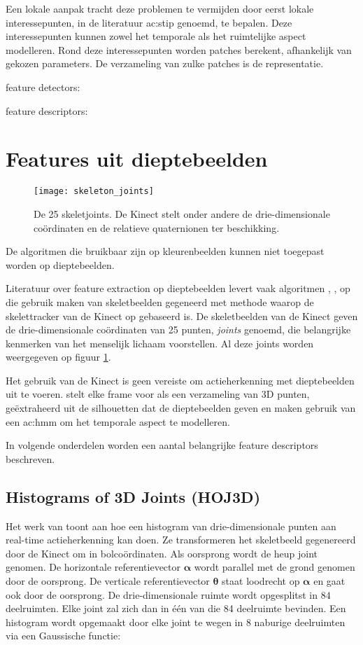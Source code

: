 Een lokale aanpak tracht deze problemen te vermijden door eerst lokale interessepunten, in de literatuur \gls{ac:stip} genoemd, te bepalen. Deze interessepunten kunnen zowel het temporale als het ruimtelijke aspect modelleren. Rond deze interessepunten worden patches berekent, afhankelijk van gekozen parameters. De verzameling van zulke patches is de representatie. 
 
feature detectors:

feature descriptors:
 
\section{Features uit dieptebeelden}
\begin{figure}
	\centering
	\texttt{[image: skeleton\_joints]}
	\caption{De 25 skeletjoints. De Kinect stelt onder andere de drie-dimensionale coördinaten en de relatieve quaternionen ter beschikking.}
	\label{fig:skeleton_joints}
\end{figure}
De algoritmen die bruikbaar zijn op kleurenbeelden kunnen niet toegepast worden op dieptebeelden. 

Literatuur over feature extraction op dieptebeelden levert vaak algoritmen \cite{Xia2012}, \cite{wang2012b}, \cite{Yang2012} op die gebruik maken van skeletbeelden gegeneerd met methode \cite{Shotton2011} waarop de skelettracker van de Kinect op gebaseerd is. De skeletbeelden van de Kinect geven de drie-dimensionale coördinaten van 25 punten, \textit{joints} genoemd, die belangrijke kenmerken van het menselijk lichaam voorstellen. Al deze joints worden weergegeven op figuur \ref{fig:skeleton_joints}.

Het gebruik van de Kinect is geen vereiste om actieherkenning met dieptebeelden uit te voeren. \cite{Li2010} stelt elke frame voor als een verzameling van 3D punten, geëxtraheerd uit de silhouetten dat de dieptebeelden geven en maken gebruik van een \gls{ac:hmm} om het temporale aspect te modelleren. \cite{Wang2012a} 

In volgende onderdelen worden een aantal belangrijke feature descriptors beschreven.
\subsection{Histograms of 3D Joints (HOJ3D)}
Het werk van \cite{Xia2012} toont aan hoe een histogram van drie-dimensionale punten aan real-time actieherkenning kan doen. Ze transformeren het skeletbeeld gegenereerd door de Kinect om in bolcoördinaten. Als oorsprong wordt de heup joint genomen. De horizontale referentievector $\mathbf{\alpha}$ wordt parallel met de grond genomen door de oorsprong. De verticale referentievector $\mathbf{\theta}$ staat loodrecht op $\mathbf{\alpha}$ en gaat ook door de oorsprong. De drie-dimensionale ruimte wordt opgesplitst in $84$ deelruimten. Elke joint zal zich dan in één van die 84 deelruimte bevinden. Een histogram wordt opgemaakt door elke joint te wegen in 8 naburige deelruimten via een Gaussische functie:

